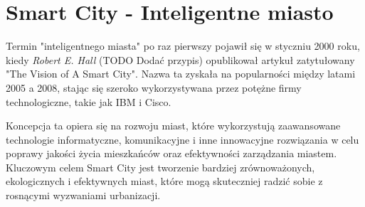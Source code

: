 \section{Smart City - Inteligentne miasto}

\par Termin "inteligentnego miasta" po raz pierwszy pojawił się w styczniu 2000 roku, kiedy \emph{Robert E. Hall} (TODO Dodać przypis) opublikował artykuł zatytułowany "The Vision of A Smart City". Nazwa ta zyskała na popularności między latami 2005 a 2008, stając się szeroko wykorzystywana przez potężne firmy technologiczne, takie jak IBM i Cisco.

\par Koncepcja ta opiera się na rozwoju miast, które wykorzystują zaawansowane technologie informatyczne, komunikacyjne i inne innowacyjne rozwiązania w celu poprawy jakości życia mieszkańców oraz efektywności zarządzania miastem. Kluczowym celem Smart City jest tworzenie bardziej zrównoważonych, ekologicznych i efektywnych miast, które mogą skuteczniej radzić sobie z rosnącymi wyzwaniami urbanizacji.

